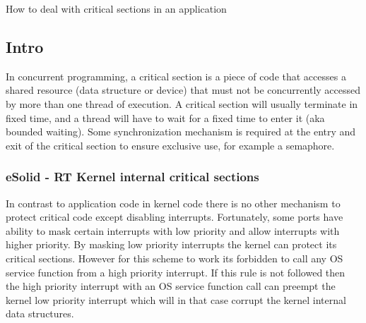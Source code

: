 How to deal with critical sections in an application\hypertarget{critical_section_cs_intro}{}\subsection{Intro}\label{critical_section_cs_intro}
In concurrent programming, a critical section is a piece of code that accesses a shared resource (data structure or device) that must not be concurrently accessed by more than one thread of execution. A critical section will usually terminate in fixed time, and a thread will have to wait for a fixed time to enter it (aka bounded waiting). Some synchronization mechanism is required at the entry and exit of the critical section to ensure exclusive use, for example a semaphore.\hypertarget{critical_section_kern_critical_sections}{}\subsubsection{e\-Solid -\/ R\-T Kernel internal critical sections}\label{critical_section_kern_critical_sections}
In contrast to application code in kernel code there is no other mechanism to protect critical code except disabling interrupts. Fortunately, some ports have ability to mask certain interrupts with low priority and allow interrupts with higher priority. By masking low priority interrupts the kernel can protect its critical sections. However for this scheme to work its forbidden to call any O\-S service function from a high priority interrupt. If this rule is not followed then the high priority interrupt with an O\-S service function call can preempt the kernel low priority interrupt which will in that case corrupt the kernel internal data structures.

